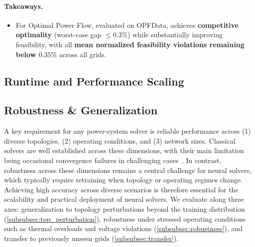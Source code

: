 \begin{boxH}
\paragraph{Takeaways.}

\begin{itemize}

\item For Optimal Power Flow, evaluated on OPFData, \genco achieves \textbf{competitive optimality} (worst-case gap $\leq0.3\%$) while substantially improving feasibility, with all \textbf{mean normalized feasibility violations remaining below $0.35\%$} across all grids.
\end{itemize}
\end{boxH}



\subsection{Runtime and Performance Scaling}
\label{subsec:scaling}




\subsection{Robustness \& Generalization}

\label{subsec:generalization}

A key requirement for any power-system solver is reliable performance across (1) diverse topologies, (2) operating conditions, and (3) network sizes. Classical solvers are well established across these dimensions, with their main limitation being occasional convergence failures in challenging cases~\cite{tostado2021solving}. In contrast, robustness across these dimensions remains a central challenge for neural solvers, which typically require retraining when topology or operating regimes change. Achieving high accuracy across diverse scenarios is therefore essential for the scalability and practical deployment of neural solvers. We evaluate \genco along three axes: generalization to topology perturbations beyond the training distribution (\cref{subsubsec:top_perturbation}), robustness under stressed operating conditions such as thermal overloads and voltage violations (\cref{subsubsec:robustness}), and transfer to previously unseen grids (\cref{subsubsec:transfer}). %



